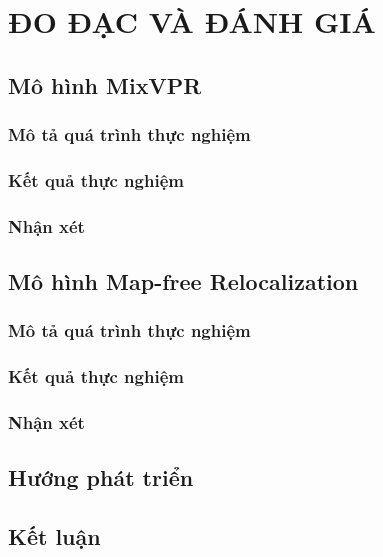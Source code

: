\chapter{ĐO ĐẠC VÀ ĐÁNH GIÁ}

\section{Mô hình MixVPR}
\subsection*{Mô tả quá trình thực nghiệm}
\subsection*{Kết quả thực nghiệm}
\subsection*{Nhận xét}


\section{Mô hình Map-free Relocalization}
\subsection*{Mô tả quá trình thực nghiệm}
\subsection*{Kết quả thực nghiệm}
\subsection*{Nhận xét}

\section{Hướng phát triển}

\section{Kết luận}